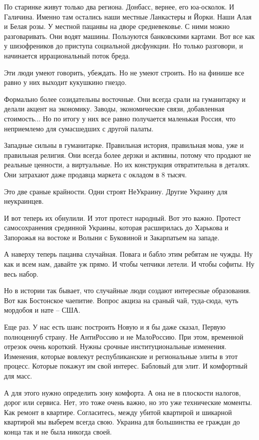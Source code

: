 По старинке живут только два региона. Донбасс, вернее, его юа-осколок. И
Галичина. Именно там остались наши местные Ланкастеры и Йорки. Наши Алая и
Белая розы. У местной пацанвы на дворе средневековье. С ними можно
разговаривать. Они водят машины. Пользуются банковскими картами. Вот все как у
шизофреников до приступа социальной дисфункции. Но только разговори, и
начинается иррациональный поток бреда.

Эти люди умеют говорить, убеждать. Но не умеют строить. Но на финише все равно
у них выходит кукушкино гнездо.

Формально более созидательны восточные. Они всегда срали на гуманитарку и
делали акцент на экономику. Заводы, экономические связи, добавленная
стоимость... Но по итогу у них все равно получается маленькая Россия, что
неприемлемо для сумасшедших с другой палаты.

Западные сильны в гуманитарке. Правильная история, правильная мова, уже и
правильная религия. Они всегда более дерзки и активны, потому что продают не
реальные ценности, а виртуальные. Но их конструкция отвратительна в деталях.
Они затрахают даже продавца маркета с окладом в 8 тысяч.

Это две сраные крайности. Одни строят НеУкраину. Другие Украину для
неукраинцев.

И вот теперь их обнулили. И этот протест народный. Вот это важно. Протест
самосохранения срединной Украины, которая расширилась до Харькова и Запорожья
на востоке и Волыни с Буковиной и Закарпатьем на западе.

А наверху теперь пацанва случайная. Повага и бабло этим ребятам не чужды. Ну
как и всем нам, давайте уж прямо. И чтобы чепчики летели. И чтобы софиты. Ну
весь набор.

Но в истории так бывает, что случайные люди создают интересные образования. Вот
как Бостонское чаепитие. Вопрос акциза на сраный чай, туда-сюда, чуть мордобоя
и нате – США.

Еще раз. У нас есть шанс построить Новую и я бы даже сказал, Первую полноценнуб
страну. Не АнтиРоссию и не МалоРоссию. При этом, временной отрезок очень
короткий. Нужны срочные институциональные изменения. Изменения, которые
вовлекут республиканские и региональные элиты в этот процесс. Которые покажут
им свой интерес. Бабловый для элит. И комфортный для масс.

А для этого нужно определить зону комфорта. А она не в плоскости налогов, дорог
или сервиса. Нет, это тоже очень важно, но это уже технические моменты. Как
ремонт в квартире. Согласитесь, между убитой квартирой и шикарной квартирой мы
выберем всегда свою. Украина для большинства ее граждан до конца так и не была
никогда своей.

